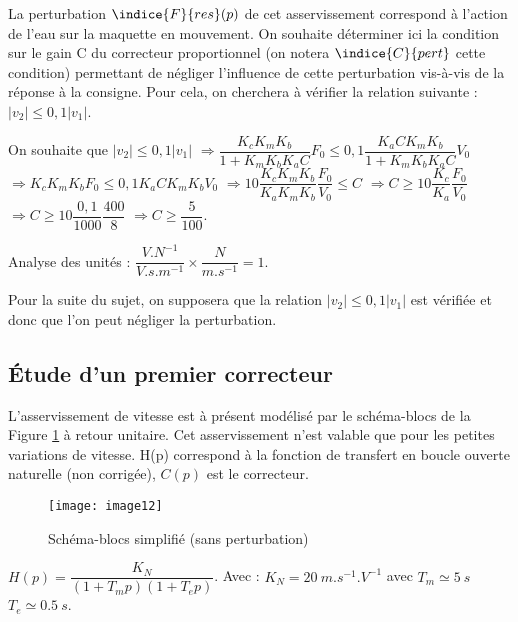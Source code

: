 La perturbation $\indice{F}{res}(p)$ de cet asservissement correspond à l'action de l'eau sur la maquette en mouvement. On souhaite déterminer ici la condition sur le gain C du correcteur proportionnel (on notera $\indice{C}{pert}$ cette condition) permettant de négliger l'influence de cette perturbation vis-à-vis de la réponse à la consigne. Pour cela, on cherchera à vérifier la relation suivante : $|v_2| \leq 0,1 |v_1|$.

\ifprof
\begin{corrige}
On souhaite que $|v_2| \leq 0,1 |v_1|$ 
$\Rightarrow \dfrac{K_c K_mK_b}{1+ K_mK_bK_a C} F_0 \leq 0,1 \dfrac{K_a C K_m K_b}{1+ K_mK_bK_a C} V_0$
$\Rightarrow K_c K_mK_b F_0 \leq 0,1 K_a C K_m K_b V_0$
$\Rightarrow 10\dfrac{K_c K_mK_b}{K_a  K_m K_b} \dfrac{F_0}{V_0} \leq  C $
$\Rightarrow C \geq 10\dfrac{K_c }{K_a } \dfrac{F_0}{V_0}  $
$\Rightarrow C \geq 10\dfrac{0,1}{1000 } \dfrac{400}{8}  $
$\Rightarrow C \geq \dfrac{5}{100} $.

Analyse des unités : $\dfrac{\si{V.N^{-1}}}{\si{V.s.m^{-1}}}\times \dfrac{\si{N}}{\si{m.s^{-1}}} = 1$.
\end{corrige}
\else
\fi

Pour la suite du sujet, on supposera que la relation $|v_2 | \leq 0,1 |v_1 |$ est vérifiée et donc que l'on peut négliger la perturbation.

\subsection{Étude d'un premier correcteur}

L'asservissement de vitesse est à présent modélisé par le schéma-blocs de la Figure \ref{fig:CCMP:2021:12} à retour unitaire. Cet asservissement n’est valable que pour les petites variations de vitesse.
H(p) correspond à la fonction de transfert en boucle ouverte naturelle (non corrigée), $C(p)$ est le correcteur.
 
\begin{figure}[!h]
\centering
\texttt{[image: image12]}
\caption{\label{fig:CCMP:2021:12} Schéma-blocs simplifié (sans perturbation)}
\end{figure}  

$H(p)=\dfrac{K_N}{\left(1+T_m p\right) \left(1+T_e p\right)}$. 
Avec : $K_N=\SI{20}{m.s^{-1}.V^{-1}}$ avec $T_m\simeq \SI{5}{s}$	$T_e\simeq\SI{0,5}{s}$.
 

